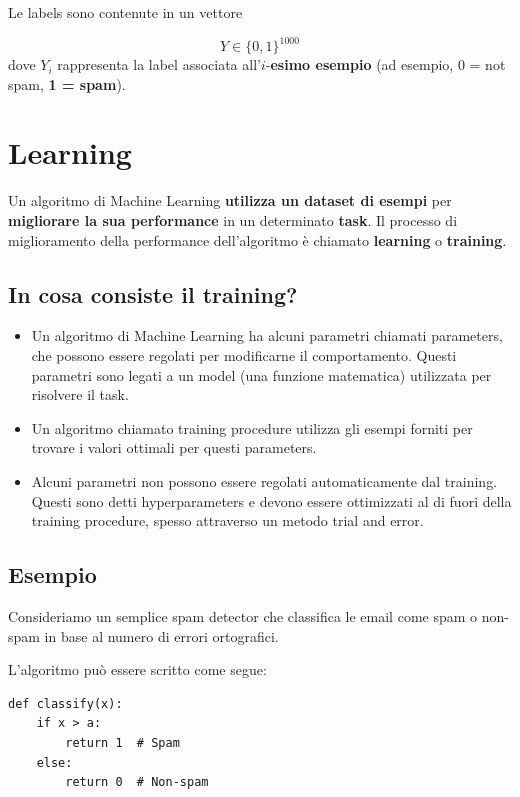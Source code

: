 \noindent
Le labels sono contenute in un vettore

$$ Y \in \{0,1\}^{1000} $$
dove $ Y_i $ rappresenta la label associata all’$i$-\textbf{esimo esempio} (ad esempio, 0 = not spam, \textbf{1 = spam}).

\section{Learning}

Un algoritmo di Machine Learning \textbf{utilizza un dataset di esempi} per \textbf{migliorare la sua performance} in un determinato \textbf{task}. Il processo di miglioramento della performance dell'algoritmo è chiamato \textbf{learning} o \textbf{training}.

\subsection{In cosa consiste il training?}

\begin{itemize}
\item Un algoritmo di Machine Learning ha alcuni parametri chiamati parameters, che possono essere regolati per modificarne il comportamento. Questi parametri sono legati a un model (una funzione matematica) utilizzata per risolvere il task.
\item Un algoritmo chiamato training procedure utilizza gli esempi forniti per trovare i valori ottimali per questi parameters.
\item Alcuni parametri non possono essere regolati automaticamente dal training. Questi sono detti hyperparameters e devono essere ottimizzati al di fuori della training procedure, spesso attraverso un metodo trial and error.
\end{itemize}

\subsection{Esempio}

Consideriamo un semplice spam detector che classifica le email come spam o non-spam in base al numero di errori ortografici. 

\noindent
L'algoritmo può essere scritto come segue:


\begin{lstlisting}[style=py,caption={Soglia sul numero di errori ortografici, chiaramente un approccio naive},label={lst:spam-threshold}]
def classify(x):
    if x > a:
        return 1  # Spam
    else:
        return 0  # Non-spam
\end{lstlisting}

